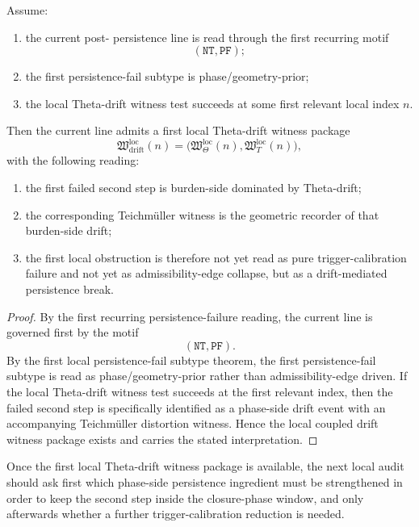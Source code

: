 \begin{theorem}
\label{thm:first-local-theta-drift-witness-theorem}
Assume:
\begin{enumerate}
 \item the current post- persistence line is read through the first recurring motif
 \[
 (\mathtt{NT},\mathtt{PF});
 \]
 \item the first persistence-fail subtype is phase/geometry-prior;
 \item the local Theta-drift witness test succeeds at some first relevant local index \(n\).
\end{enumerate}
Then the current line admits a first local Theta-drift witness package
\[
\mathfrak{W}_{\mathrm{drift}}^{\mathrm{loc}}(n)
=
\bigl(
\mathfrak{W}_{\Theta}^{\mathrm{loc}}(n),
\mathfrak{W}_{T}^{\mathrm{loc}}(n)
\bigr),
\]
with the following reading:
\begin{enumerate}
 \item the first failed second step is burden-side dominated by Theta-drift;
 \item the corresponding Teichm\"uller witness is the geometric recorder of that burden-side drift;
 \item the first local obstruction is therefore not yet read as pure trigger-calibration failure and not yet as admissibility-edge collapse, but as a drift-mediated persistence break.
\end{enumerate}
\end{theorem}

\begin{proof}
By the first recurring persistence-failure reading, the current line is governed first by the motif
\[
(\mathtt{NT},\mathtt{PF}).
\]
By the first local persistence-fail subtype theorem, the first persistence-fail subtype is read as phase/geometry-prior rather than admissibility-edge driven.
If the local Theta-drift witness test succeeds at the first relevant index, then the failed second step is specifically identified as a phase-side drift event with an accompanying Teichm\"uller distortion witness.
Hence the local coupled drift witness package exists and carries the stated interpretation.
\end{proof}

\begin{corollary}
\label{cor:current-post-r19-drift-diagnosis-rule}
Once the first local Theta-drift witness package is available, the next local audit should ask first which phase-side persistence ingredient must be strengthened in order to keep the second step inside the closure-phase window, and only afterwards whether a further trigger-calibration reduction is needed.
\end{corollary}

